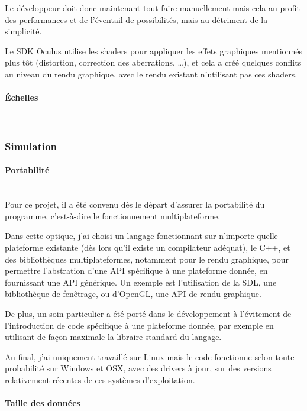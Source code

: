 \documentclass[a4paper,french,12pt]{article}
\begin{document}
		Le développeur doit donc maintenant tout faire manuellement mais cela au profit des performances et de l'éventail
		de possibilités, mais au détriment de la simplicité.
		
		Le SDK Oculus utilise les shaders pour appliquer les effets graphiques mentionnés plus tôt (distortion, 
		correction des aberrations, \ldots), et cela a créé quelques conflits au niveau du rendu graphique, 
		avec le rendu existant n'utilisant pas ces shaders.
		
	     \paragraph{Échelles} ~\\
	      
		
	    \subsubsection{Simulation}
		\paragraph{Portabilité} ~\\
		
		
		  Pour ce projet, il a été convenu dès le départ d'assurer la portabilité du programme, c'est-à-dire
		  le fonctionnement multiplateforme.
		  
		  Dans cette optique, j'ai choisi un langage fonctionnant sur n'importe quelle plateforme existante 
		  (dès lors qu'il existe un compilateur adéquat), le C++, et
		  des bibliothèques multiplateformes, notamment pour le rendu graphique,
		  pour permettre l'abstration d'une API spécifique à une plateforme donnée, en fournissant une API générique.
		  Un exemple est l'utilisation de la SDL, une bibliothèque de fenêtrage, ou d'OpenGL, une API de rendu
		  graphique.
		  
		  De plus, un soin particulier a été porté dans le développement à  l'évitement de l'introduction 
		  de code spécifique à une plateforme donnée, par exemple en utilisant de façon maximale la libraire 
		  standard du langage.
		  
		  Au final, j'ai uniquement travaillé sur Linux mais le code fonctionne selon toute probabilité sur 
		  Windows et OSX, avec des drivers à jour, sur des versions relativement récentes de ces systèmes d'exploitation.
		  
		  
		  
		\paragraph{Taille des données} ~\\
		
\end{document}
